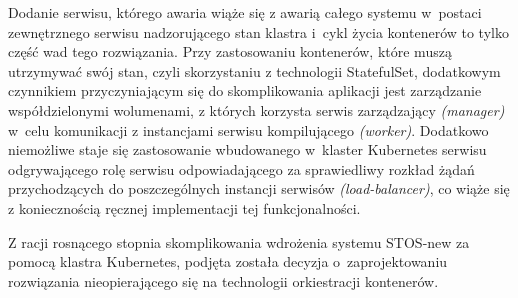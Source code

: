 Dodanie serwisu, którego awaria wiąże się z awarią całego systemu w~postaci zewnętrznego serwisu nadzorującego stan klastra i~cykl życia kontenerów to tylko część wad tego rozwiązania. Przy zastosowaniu kontenerów, które muszą utrzymywać swój stan, czyli skorzystaniu z technologii StatefulSet, dodatkowym czynnikiem przyczyniającym się do skomplikowania aplikacji jest zarządzanie współdzielonymi wolumenami, z których korzysta serwis zarządzający \textit{(manager)} w~celu komunikacji z instancjami serwisu kompilującego \textit{(worker)}. Dodatkowo niemożliwe staje się zastosowanie wbudowanego w~klaster Kubernetes serwisu odgrywającego rolę serwisu odpowiadającego za sprawiedliwy rozkład żądań przychodzących do poszczególnych instancji serwisów \textit{(load-balancer)}, co wiąże się z koniecznością ręcznej implementacji tej funkcjonalności.

Z racji rosnącego stopnia skomplikowania wdrożenia systemu STOS-new za pomocą klastra Kubernetes, podjęta została decyzja o~zaprojektowaniu rozwiązania nieopierającego się na technologii orkiestracji kontenerów.
